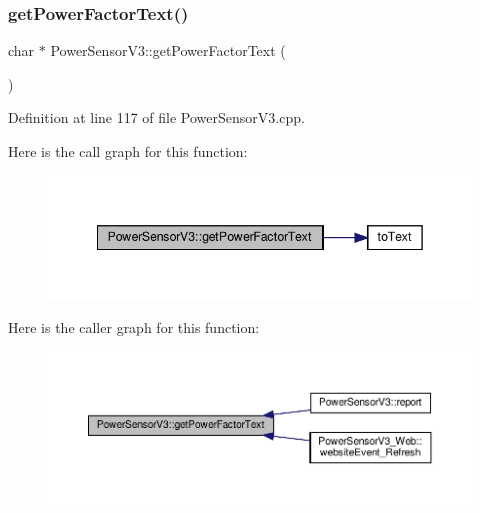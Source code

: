 \subsubsection{\texorpdfstring{get\+Power\+Factor\+Text()}{getPowerFactorText()}\hspace{0.1cm}{\footnotesize\ttfamily [1/2]}}
{\footnotesize\ttfamily char $\ast$ Power\+Sensor\+V3\+::get\+Power\+Factor\+Text (\begin{DoxyParamCaption}{ }\end{DoxyParamCaption})}



Definition at line 117 of file Power\+Sensor\+V3.\+cpp.

Here is the call graph for this function\+:
\nopagebreak
\begin{figure}[H]
\begin{center}
\leavevmode
\includegraphics[width=342pt]{class_power_sensor_v3_a0799057ba96ffc74b372b88d94874d33_cgraph}
\end{center}
\end{figure}
Here is the caller graph for this function\+:
\nopagebreak
\begin{figure}[H]
\begin{center}
\leavevmode
\includegraphics[width=350pt]{class_power_sensor_v3_a0799057ba96ffc74b372b88d94874d33_icgraph}
\end{center}
\end{figure}
\mbox{\label{class_power_sensor_v3_a30dbbeda8f4694994b31dd423fee414e}} 
